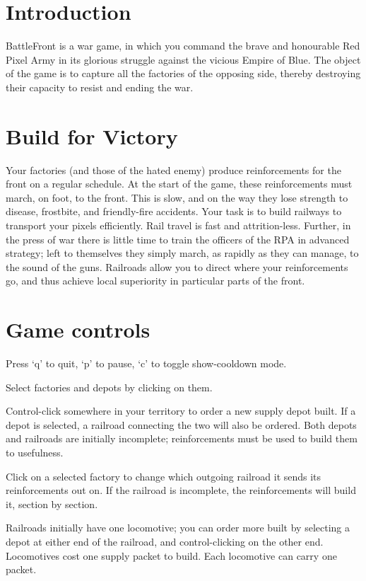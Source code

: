 \documentclass[12pt]{article}
\begin{document}
\section{Introduction}

BattleFront is a war game, in which you command the brave and
honourable Red Pixel Army in its glorious struggle against the
vicious Empire of Blue. The object of the game is to capture all the
factories of the opposing side, thereby destroying their capacity to
resist and ending the war. 

\section{Build for Victory}

Your factories (and those of the hated enemy) produce reinforcements
for the front on a regular schedule. At the start of the game, these
reinforcements must march, on foot, to the front. This is slow, and
on the way they lose strength to disease, frostbite, and friendly-fire
accidents. Your task is to build railways to transport your pixels
efficiently. Rail travel is fast and attrition-less. Further, in the
press of war there is little time to train the officers of the RPA in
advanced strategy; left to themselves they simply march, as rapidly as
they can manage, to the sound of the guns. Railroads allow you to
direct where your reinforcements go, and thus achieve local
superiority in particular parts of the front. 

\section{Game controls}

Press `q' to quit, `p' to pause, `c' to toggle show-cooldown mode.

Select factories and depots by clicking on them. 

Control-click somewhere in your territory to order a new supply depot
built. If a depot is selected, a railroad connecting the two will also
be ordered. Both depots and railroads are initially incomplete;
reinforcements must be used to build them to usefulness. 

Click on a selected factory to change which outgoing railroad it sends
its reinforcements out on. If the railroad is incomplete, the
reinforcements will build it, section by section. 

Railroads initially have one locomotive; you can order more built by
selecting a depot at either end of the railroad, and control-clicking
on the other end. Locomotives cost one supply packet to build. Each
locomotive can carry one packet. 
\end{document}
